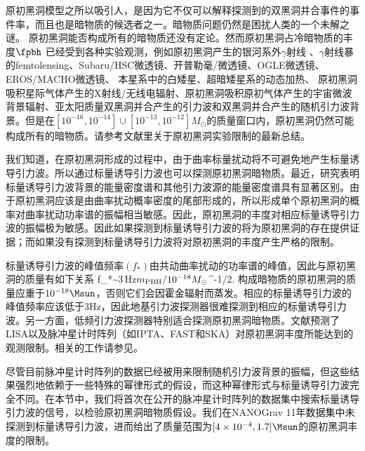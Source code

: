原初黑洞模型之所以吸引人，是因为它不仅可以解释\lvc 探测到的双黑洞并合事件的事件率，而且也是暗物质的候选者之一。暗物质问题仍然是困扰人类的一个未解之谜。
原初黑洞能否构成所有的暗物质还没有定论。然而原初黑洞占冷暗物质的丰度$\fpbh$
已经受到各种实验观测，例如原初黑洞产生的银河系外$\gamma$射线 \cite{Carr:2009jm}、$\gamma$射线暴的femtolensing\cite{Barnacka:2012bm}、Subaru/HSC微透镜\cite{Niikura:2017zjd}、开普勒毫/微透镜\cite{Griest:2013esa}、OGLE微透镜\cite{Niikura:2019kqi}、EROS/MACHO微透镜\cite{Tisserand:2006zx}、
本星系中的白矮星\cite{Graham:2015apa}、超暗矮星系的动态加热\cite{Brandt:2016aco}、
原初黑洞吸积星际气体产生的X射线/无线电辐射\cite{Gaggero:2016dpq}、原初黑洞吸积原初气体产生的宇宙微波背景辐射\cite{Ali-Haimoud:2016mbv,Blum:2016cjs,Horowitz:2016lib,Chen:2016pud}、亚太阳质量双黑洞并合产生的引力波\cite{Abbott:2018oah,Magee:2018opb,Chen:2019irf,Authors:2019qbw}和双黑洞并合产生的随机引力波背景\cite{Wang:2016ana,Chen:2019irf}。但是在$[10^{-16},10^{-14}] \cup [10^{-13},10^{-12}] M_\odot$的质量窗口内，原初黑洞仍然可能构成所有的暗物质。请参考文献\cite{Chen:2019irf}里关于原初黑洞实验限制的最新总结。

我们知道，在原初黑洞形成的过程中，由于曲率标量扰动将不可避免地产生标量诱导引力波。所以通过标量诱导引力波也可以探测原初黑洞暗物质。最近，研究表明标量诱导引力波背景的能量密度谱和其他引力波源的能量密度谱具有显著区别\cite{Yuan:2019wwo}。由于原初黑洞应该是由曲率扰动概率密度的尾部形成的，所以形成单个原初黑洞的概率对曲率扰动功率谱的振幅相当敏感\cite{Young:2014ana}。因此，原初黑洞的丰度对相应标量诱导引力波的振幅极为敏感。因此如果探测到标量诱导引力波的将为原初黑洞的存在提供证据；而如果没有探测到标量诱导引力波将对原初黑洞的丰度产生严格的限制。


标量诱导引力波的峰值频率$(f_*)$由共动曲率扰动的功率谱的峰值，因此与原初黑洞的质量有如下关系\cite{Saito:2008jc}
\e
f_*\sim 3\,{\rm{Hz}}\({m_{\rm{PBH}}/10^{-18} M_\odot}\)^{-1/2}.
\q
构成暗物质的原初黑洞的质量应重于$10^{-18}\Msun$，否则它们会因霍金辐射而蒸发。相应的标量诱导引力波的峰值频率应该低于$3$Hz，因此地基引力波探测器很难探测到相应的标量诱导引力波。另一方面，低频引力波探测器特别适合探测原初黑洞暗物质。文献\cite{Yuan:2019udt}预测了LISA\cite{Audley:2017drz}以及脉冲星计时阵列（如IPTA\cite{Hobbs:2009yy}、FAST\cite{Nan:2011um}和SKA\cite{Kramer:2015jsa}）对原初黑洞丰度所能达到的观测限制。相关的工作请参见\cite{Inomata:2016rbd,Schutz:2016khr,Orlofsky:2016vbd,Dror:2019twh,Wang:2019kaf,Cai:2019elf,Clesse:2018ogk}。

尽管目前脉冲星计时阵列的数据已经被用来限制随机引力波背景的振幅，但这些结果强烈地依赖于一些特殊的幂律形式的假设，而这种幂律形式与标量诱导引力波完全不同\cite{Yuan:2019udt}。在本节中，我们将首次在公开的脉冲星计时阵列的数据集中搜索标量诱导引力波的信号，以检验原初黑洞暗物质假设。我们在NANOGrav 11年数据集中未探测到标量诱导引力波，进而给出了质量范围为$[4\times 10^{-4}, 1.7]\Msun$的原初黑洞丰度的限制。

